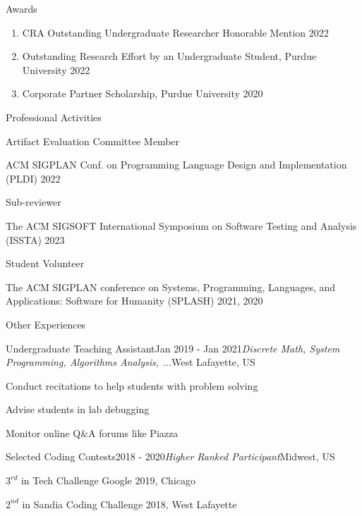 \documentclass{resume} %
\begin{document}
\begin{rSection}{Awards}
\begin{enumerate}
    \itemsep-0.2cm
    \item CRA Outstanding Undergraduate Researcher Honorable Mention \hfill 2022
    \item Outstanding Research Effort by an Undergraduate Student, Purdue University \hfill 2022
    \item Corporate Partner Scholarship, Purdue University \hfill 2020 
\end{enumerate}
\end{rSection}


\begin{rSection}{Professional Activities}

\begin{rSubsection}{Artifact Evaluation Committee Member}{}{}{}
    \item ACM SIGPLAN Conf. on Programming Language Design and Implementation (PLDI) 2022
\end{rSubsection}

\begin{rSubsection}{Sub-reviewer}{}{}{}
    \item The ACM SIGSOFT International Symposium on Software Testing and Analysis (ISSTA) 2023
\end{rSubsection}

\begin{rSubsection}{Student Volunteer}{}{}{}
    \item The ACM SIGPLAN conference on Systems, Programming, Languages, and Applications: Software for Humanity (SPLASH) 2021, 2020
\end{rSubsection}

\end{rSection}

\begin{rSection}{ Other Experiences}

\begin{rSubsection}{Undergraduate Teaching Assistant}{Jan 2019 - Jan 2021}{\textit{Discrete Math, System Programming, Algorithms Analysis, ...}}{West Lafayette, US}
\item Conduct recitations to help students with problem solving
\item Advise students in lab debugging
\item Monitor online Q\&A forums like Piazza
\end{rSubsection}

\begin{rSubsection}{Selected Coding Contests}{2018 - 2020}{\it Higher Ranked Participant}{Midwest, US}
\item $3^{rd}$ in Tech Challenge Google 2019, Chicago
\item $2^{nd}$ in Sandia Coding Challenge 2018, West Lafayette

\end{rSubsection}


\end{rSection}
\end{document}
